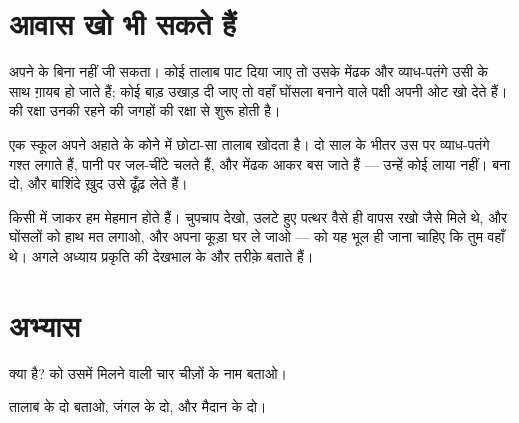 \section{आवास खो भी सकते हैं}

\begin{proposition}[आवास नहीं, तो बाशिंदे नहीं]\label{prop:g2:where-animals-live:loss}
 अपने  के बिना नहीं जी सकता। कोई तालाब पाट दिया जाए तो उसके
मेंढक और व्याध-पतंगे उसी के साथ ग़ायब हो जाते हैं; कोई बाड़ उखाड़ दी
जाए तो वहाँ घोंसला बनाने वाले पक्षी अपनी ओट खो देते हैं।  की
रक्षा उनकी रहने की जगहों की रक्षा से शुरू होती है।
\end{proposition}
\admitted

\begin{example}[स्कूल का तालाब]\label{ex:g2:where-animals-live:schoolpond}
एक स्कूल अपने अहाते के कोने में छोटा-सा तालाब खोदता है। दो साल के
भीतर उस पर व्याध-पतंगे गश्त लगाते हैं, पानी पर जल-चींटे चलते हैं, और
मेंढक आकर बस जाते हैं --- उन्हें कोई लाया नहीं।  बना दो, और
बाशिंदे ख़ुद उसे ढूँढ़ लेते हैं।
\end{example}

\begin{remark}[बिना खलल डाले देखना]\label{rem:g2:where-animals-live:respect}
किसी  में जाकर हम मेहमान होते हैं। चुपचाप देखो, उलटे हुए पत्थर
वैसे ही वापस रखो जैसे मिले थे,  और घोंसलों को हाथ मत लगाओ, और
अपना कूड़ा घर ले जाओ ---  को यह भूल ही जाना चाहिए कि तुम वहाँ थे।
अगले अध्याय प्रकृति की देखभाल के और तरीक़े बताते हैं।
\end{remark}

\section{अभ्यास}

\begin{exercise}[$\star$]\label{exo:g2:where-animals-live:1}
 क्या है?  को उसमें मिलने वाली चार चीज़ों के नाम बताओ।
\end{exercise}

\begin{exercise}[$\star$]\label{exo:g2:where-animals-live:2}
तालाब के दो  बताओ, जंगल के दो, और मैदान के दो।
\end{exercise}


